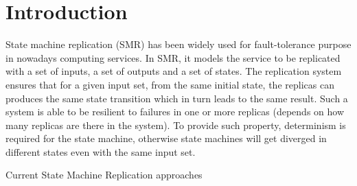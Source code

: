 \chapter{Introduction}
State machine replication (SMR) has been widely used for fault-tolerance purpose in nowadays computing services. In SMR, it models the service to be replicated with a set of inputs, a set of outputs and a set of states. The replication system ensures that for a given input set, from the same initial state, the replicas can produces the same state transition which in turn leads to the same result. Such a system is able to be resilient to failures in one or more replicas (depends on how many replicas are there in the system). To provide such property, determinism is required for the state machine, otherwise state machines will get diverged in different states even with the same input set.

Current State Machine Replication approaches